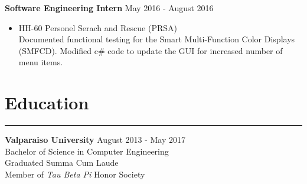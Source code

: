 \documentclass[10pt, letterpaper]{article}
\begin{document}
\textbf{Software Engineering Intern} \hfill May 2016 - August 2016 \\
\vspace{-4ex}
\begin{itemize}[noitemsep]
    \item HH-60 Personel Serach and Rescue (PRSA) \\
    Documented functional testing for the Smart Multi-Function Color Displays (SMFCD). Modified c\# code to update the GUI for increased number of menu items.
\end{itemize}



\section*{Education} \vspace{-2ex} \hrule
\vspace{1ex}

\textbf{Valparaiso University} \hfill August 2013 - May 2017 \\
\indent Bachelor of Science in Computer Engineering \\
\indent \indent Graduated Summa Cum Laude \\
\indent \indent Member of \emph{Tau Beta Pi} Honor Society
\end{document}

